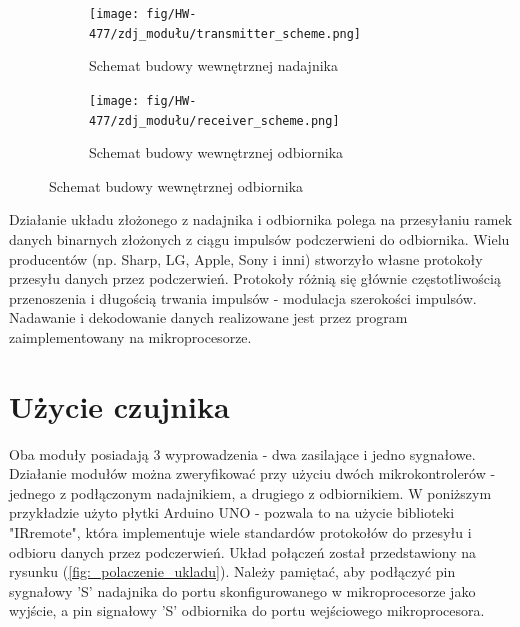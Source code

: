 \documentclass[11pt, a4paper]{article}
\begin{document}
\begin{figure}[h]
\centering
\begin{subfigure}{.5\textwidth}
\centering
\texttt{[image: fig/HW-477/zdj\_modułu/transmitter\_scheme.png]}
\caption{Schemat budowy wewnętrznej nadajnika}
\label{fig:_schemat_nadajnik}
\end{subfigure}%
\begin{subfigure}{.5\textwidth}
\centering
\texttt{[image: fig/HW-477/zdj\_modułu/receiver\_scheme.png]}
\caption{Schemat budowy wewnętrznej odbiornika}
\label{fig:_schemat_odbiornik}
\end{subfigure}
\label{fig:modul}
\end{figure}
\vspace{0.25cm}
Działanie układu złożonego z nadajnika i odbiornika polega na przesyłaniu ramek danych binarnych złożonych z ciągu impulsów podczerwieni do odbiornika. Wielu producentów (np. Sharp, LG, Apple, Sony i inni) stworzyło własne protokoły przesyłu danych przez podczerwień. Protokoły różnią się głównie częstotliwością przenoszenia i długością trwania impulsów - modulacja szerokości impulsów. Nadawanie i dekodowanie danych realizowane jest przez program zaimplementowany na mikroprocesorze.


\newpage

\section{Użycie czujnika}
Oba moduły posiadają 3 wyprowadzenia - dwa zasilające i jedno sygnałowe. Działanie modułów można zweryfikować przy użyciu dwóch mikrokontrolerów - jednego z podłączonym nadajnikiem, a drugiego z odbiornikiem. W poniższym przykładzie użyto płytki Arduino UNO - pozwala to na użycie biblioteki "IRremote", która implementuje wiele standardów protokołów do przesyłu i odbioru danych przez podczerwień. Układ połączeń został przedstawiony na rysunku (\ref{fig:_polaczenie_ukladu}). Należy pamiętać, aby podłączyć pin sygnałowy 'S' nadajnika do portu skonfigurowanego w mikroprocesorze jako wyjście, a pin signałowy 'S' odbiornika do portu wejściowego mikroprocesora.
\end{document}

